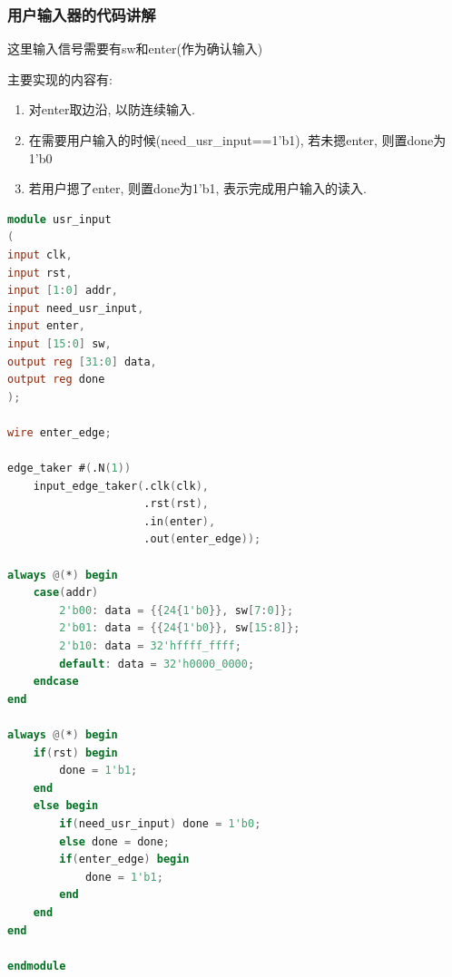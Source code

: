 \documentclass[UTF8]{article}
\begin{document}
\subsubsection{用户输入器的代码讲解}
这里输入信号需要有sw和enter(作为确认输入)\par
主要实现的内容有:
\begin{enumerate}
	\item 对enter取边沿, 以防连续输入.
	\item 在需要用户输入的时候(need\_usr\_input==1'b1), 若未摁enter, 则置done为1'b0
	\item 若用户摁了enter, 则置done为1'b1, 表示完成用户输入的读入.
\end{enumerate}
\begin{lstlisting}[language=verilog]
module usr_input
(
input clk,
input rst,
input [1:0] addr,
input need_usr_input,
input enter,
input [15:0] sw,
output reg [31:0] data,
output reg done
);

wire enter_edge;

edge_taker #(.N(1))
    input_edge_taker(.clk(clk),
                     .rst(rst),
                     .in(enter),
                     .out(enter_edge));
                     
always @(*) begin
    case(addr)
        2'b00: data = {{24{1'b0}}, sw[7:0]};
        2'b01: data = {{24{1'b0}}, sw[15:8]};
        2'b10: data = 32'hffff_ffff;
        default: data = 32'h0000_0000;
    endcase
end

always @(*) begin
    if(rst) begin
        done = 1'b1;
    end
    else begin
        if(need_usr_input) done = 1'b0;
        else done = done;
        if(enter_edge) begin
            done = 1'b1;
        end
    end
end

endmodule
\end{lstlisting}
\end{document}
